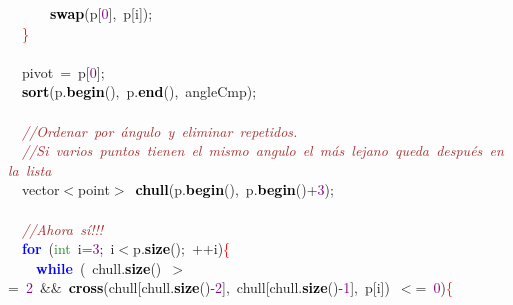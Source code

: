 {{\mbox{}\ \ \ \ \ \ \textbf{\textcolor{Black}{swap}}\textcolor{BrickRed}{(}p\textcolor{BrickRed}{[}\textcolor{Purple}{0}\textcolor{BrickRed}{],}\ p\textcolor{BrickRed}{[}i\textcolor{BrickRed}{]);} \\
\mbox{}\ \ \textcolor{Red}{\}} \\
\mbox{}\ \  \\
\mbox{}\ \ pivot\ \textcolor{BrickRed}{=}\ p\textcolor{BrickRed}{[}\textcolor{Purple}{0}\textcolor{BrickRed}{];} \\
\mbox{}\ \ \textbf{\textcolor{Black}{sort}}\textcolor{BrickRed}{(}p\textcolor{BrickRed}{.}\textbf{\textcolor{Black}{begin}}\textcolor{BrickRed}{(),}\ p\textcolor{BrickRed}{.}\textbf{\textcolor{Black}{end}}\textcolor{BrickRed}{(),}\ angleCmp\textcolor{BrickRed}{);} \\
\mbox{} \\
\mbox{}\ \ \textit{\textcolor{Brown}{//Ordenar\ por\ ángulo\ y\ eliminar\ repetidos.}} \\
\mbox{}\ \ \textit{\textcolor{Brown}{//Si\ varios\ puntos\ tienen\ el\ mismo\ angulo\ el\ más\ lejano\ queda\ después\ en\ la\ lista}} \\
\mbox{}\ \ vector\textcolor{BrickRed}{$<$}point\textcolor{BrickRed}{$>$}\ \textbf{\textcolor{Black}{chull}}\textcolor{BrickRed}{(}p\textcolor{BrickRed}{.}\textbf{\textcolor{Black}{begin}}\textcolor{BrickRed}{(),}\ p\textcolor{BrickRed}{.}\textbf{\textcolor{Black}{begin}}\textcolor{BrickRed}{()+}\textcolor{Purple}{3}\textcolor{BrickRed}{);} \\
\mbox{} \\
\mbox{}\ \ \textit{\textcolor{Brown}{//Ahora\ sí!!!}} \\
\mbox{}\ \ \textbf{\textcolor{Blue}{for}}\ \textcolor{BrickRed}{(}\textcolor{ForestGreen}{int}\ i\textcolor{BrickRed}{=}\textcolor{Purple}{3}\textcolor{BrickRed}{;}\ i\textcolor{BrickRed}{$<$}p\textcolor{BrickRed}{.}\textbf{\textcolor{Black}{size}}\textcolor{BrickRed}{();}\ \textcolor{BrickRed}{++}i\textcolor{BrickRed}{)}\textcolor{Red}{\{} \\
\mbox{}\ \ \ \ \textbf{\textcolor{Blue}{while}}\ \textcolor{BrickRed}{(}\ chull\textcolor{BrickRed}{.}\textbf{\textcolor{Black}{size}}\textcolor{BrickRed}{()}\ \textcolor{BrickRed}{$>$=}\ \textcolor{Purple}{2}\ \textcolor{BrickRed}{\&\&}\ \textbf{\textcolor{Black}{cross}}\textcolor{BrickRed}{(}chull\textcolor{BrickRed}{[}chull\textcolor{BrickRed}{.}\textbf{\textcolor{Black}{size}}\textcolor{BrickRed}{()-}\textcolor{Purple}{2}\textcolor{BrickRed}{],}\ chull\textcolor{BrickRed}{[}chull\textcolor{BrickRed}{.}\textbf{\textcolor{Black}{size}}\textcolor{BrickRed}{()-}\textcolor{Purple}{1}\textcolor{BrickRed}{],}\ p\textcolor{BrickRed}{[}i\textcolor{BrickRed}{])}\ \textcolor{BrickRed}{$<$=}\ \textcolor{Purple}{0}\textcolor{BrickRed}{)}\textcolor{Red}{\{} \\
}}
